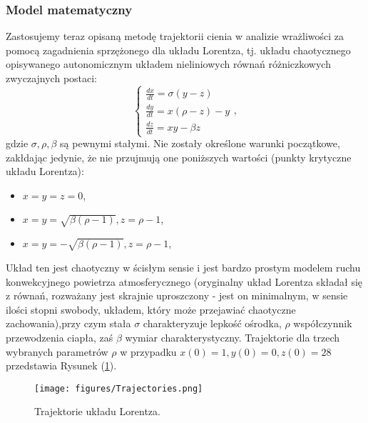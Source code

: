 \documentclass[12pt]{article}
\begin{document}
\subsubsection{Model matematyczny}
Zastosujemy teraz opisaną metodę trajektorii cienia w analizie wrażliwości za pomocą zagadnienia sprzężonego dla układu Lorentza, tj. układu chaotycznego opisywanego autonomicznym układem nieliniowych równań różniczkowych zwyczajnych postaci:
\begin{equation}
\begin{cases} 
\frac{dx}{dt} = \sigma(y-z) \\ 
\frac{dy}{dt} = x(\rho-z)-y \\ 
\frac{dz}{dt} = xy-\beta z 
\end{cases},
\label{lorenz_eq}
\end{equation}
gdzie $ \sigma, \rho, \beta $ są pewnymi stałymi. Nie zostały określone warunki początkowe, zakłdając jedynie, że nie przujmują one poniższych wartości (punkty krytyczne układu Lorentza):
\begin{itemize}
	\item $ x = y = z = 0 $,
	\item $ x = y = \sqrt{\beta(\rho - 1)}, z = \rho - 1 $,
	\item $ x = y = -\sqrt{\beta(\rho - 1)}, z = \rho - 1 $,
\end{itemize}
Układ ten jest chaotyczny w ścisłym sensie i jest bardzo prostym modelem ruchu konwekcyjnego powietrza atmosferycznego (oryginalny układ Lorentza składał się z równań, rozważany jest skrajnie uproszczony - jest on minimalnym, w sensie ilości stopni swobody, układem, który może przejawiać chaotyczne zachowania),przy czym stała   $ \sigma $ charakteryzuje lepkość ośrodka, $ \rho $ współczynnik przewodzenia ciapła, zaś $ \beta $ wymiar charakterystyczny.\newline
Trajektorie dla trzech wybranych parametrów $ \rho $ w przypadku $ x(0) = 1, y(0) = 0, z(0) = 28 $ przedstawia Rysunek (\ref{Fig15}).
\begin{figure}[H]
	\texttt{[image: figures/Trajectories.png]} 
	\centering
	\caption{Trajektorie układu Lorentza.}
	\label{Fig15}
\end{figure}
\end{document}
